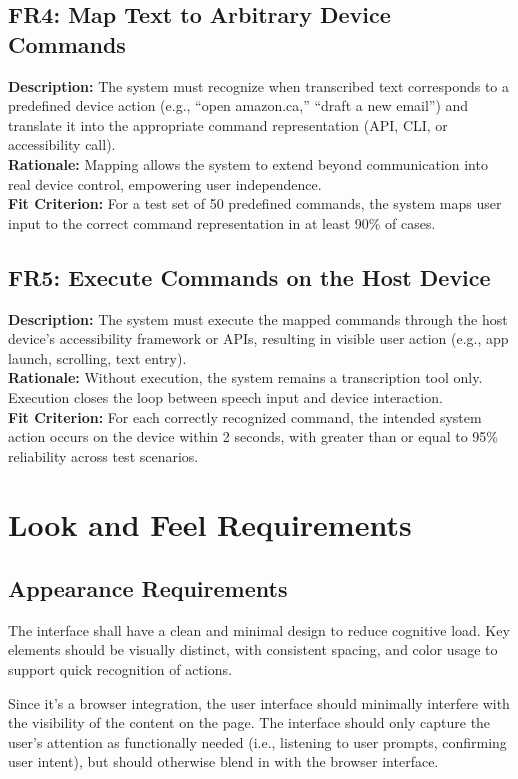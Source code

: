 \documentclass[11pt]{article}
\begin{document}
\bigskip
\subsection{FR4: Map Text to Arbitrary Device Commands}
\textbf{Description:} The system must recognize when transcribed text corresponds to a predefined device action (e.g., “open amazon.ca,” “draft a new email”) and translate it into the appropriate command representation (API, CLI, or accessibility call).\\
\textbf{Rationale:} Mapping allows the system to extend beyond communication into real device control, empowering user independence.\\
\textbf{Fit Criterion:} For a test set of 50 predefined commands, the system maps user input to the correct command representation in at least 90\% of cases.

\bigskip
\subsection{FR5: Execute Commands on the Host Device}
\textbf{Description:} The system must execute the mapped commands through the host device’s accessibility framework or APIs, resulting in visible user action (e.g., app launch, scrolling, text entry).\\
\textbf{Rationale:} Without execution, the system remains a transcription tool only. Execution closes the loop between speech input and device interaction.\\
\textbf{Fit Criterion:} For each correctly recognized command, the intended system action occurs on the device within 2 seconds, with greater than or equal to 95\% reliability across test scenarios.


\section{Look and Feel Requirements}
\subsection{Appearance Requirements}
The interface shall have a clean and minimal design to reduce cognitive load. Key elements should be visually distinct, with consistent spacing, and color usage to support quick recognition of actions.

Since it’s a browser integration, the user interface should minimally interfere with the visibility of the content on the page. The interface should only capture the user’s attention as functionally needed (i.e., listening to user prompts, confirming user intent), but should otherwise blend in with the browser interface.
\end{document}

